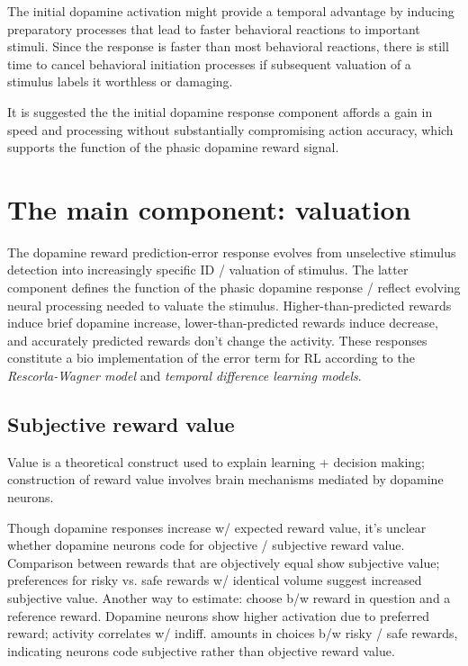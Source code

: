 \documentclass{article}
\numberwithin{equation}{section}
\begin{document}
The initial dopamine activation might provide a temporal advantage by inducing preparatory processes that lead to faster behavioral reactions to important stimuli. Since the response is faster than most behavioral reactions, there is still time to cancel behavioral initiation processes if subsequent valuation of a stimulus labels it worthless or damaging.

It is suggested the the initial dopamine response component affords a gain in speed and processing without substantially compromising action accuracy, which supports the function of the phasic dopamine reward signal.

\section{The main component: valuation}

The dopamine reward prediction-error response evolves from unselective stimulus detection into increasingly specific ID / valuation of stimulus. The latter component defines the function of the phasic dopamine response / reflect evolving neural processing needed to valuate the stimulus. Higher-than-predicted rewards induce brief dopamine increase, lower-than-predicted rewards induce decrease, and accurately predicted rewards don't change the activity. These responses constitute a bio implementation of the error term for RL according to the \textit{Rescorla-Wagner model} and \textit{temporal difference learning models}.

\subsection{Subjective reward value}

Value is a theoretical construct used to explain learning + decision making; construction of reward value involves brain mechanisms mediated by dopamine neurons.

Though dopamine responses increase w/ expected reward value, it's unclear whether dopamine neurons code for objective / subjective reward value. Comparison between rewards that are objectively equal show subjective value; preferences for risky vs. safe rewards w/ identical volume suggest increased subjective value. Another way to estimate: choose b/w reward in question and a reference reward. Dopamine neurons show higher activation due to preferred reward; activity correlates w/ indiff. amounts in choices b/w risky / safe rewards, indicating neurons code subjective rather than objective reward value.
\end{document}
